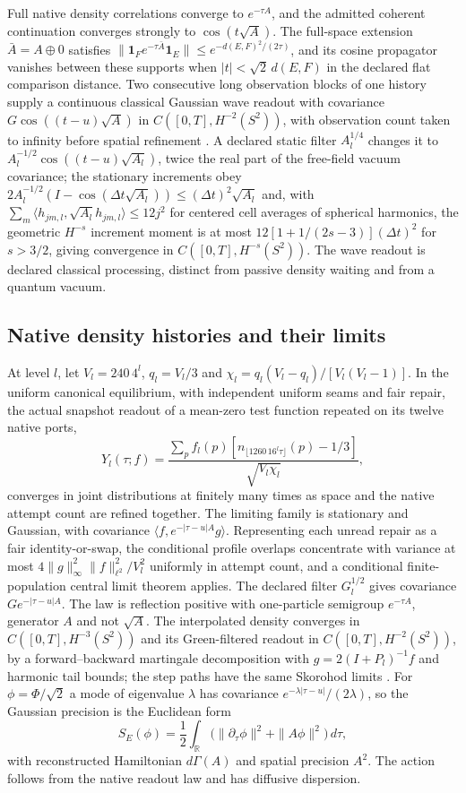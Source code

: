 \documentclass[11pt]{article}
\theoremstyle{definition}
\theoremstyle{remark}
\theoremstyle{plain}
\begin{document}
Full native density correlations converge to $e^{-\tau A}$, and the admitted
coherent continuation converges strongly to $\cos(t\sqrt A)$. The full-space
extension $\bar A=A\oplus0$ satisfies
$\|\mathbf1_F e^{-\tau\bar A}\mathbf1_E\|\le e^{-d(E,F)^2/(2\tau)}$, and its
cosine propagator vanishes between these supports when $|t|<\sqrt2\,d(E,F)$
in the declared flat comparison distance. Two consecutive long observation
blocks of one history supply a continuous classical Gaussian wave readout
with covariance $G\cos((t-u)\sqrt A)$ in $C([0,T],H^{-2}(S^2))$, with
observation count taken to infinity before spatial refinement
\cite{nativeContinuum}. A declared static filter $A_l^{1/4}$ changes it to
$A_l^{-1/2}\cos((t-u)\sqrt{A_l})$, twice the real part of the free-field
vacuum covariance; the stationary increments obey
$2A_l^{-1/2}(I-\cos(\Delta t\sqrt{A_l}))\le(\Delta t)^2\sqrt{A_l}$ and, with
$\sum_m\langle h_{jm,l},\sqrt{A_l}h_{jm,l}\rangle\le12j^2$ for centered cell
averages of spherical harmonics, the geometric $H^{-s}$ increment moment is
at most $12[1+1/(2s-3)](\Delta t)^2$ for $s>3/2$, giving convergence in
$C([0,T],H^{-s}(S^2))$. The wave readout is declared classical processing,
distinct from passive density waiting and from a quantum vacuum.

\subsection{Native density histories and their limits}
\label{sec:density}

At level $l$, let $V_l=240\,4^l$, $q_l=V_l/3$ and
$\chi_l=q_l(V_l-q_l)/[V_l(V_l-1)]$. In the uniform canonical equilibrium,
with independent uniform seams and fair repair, the actual snapshot readout
of a mean-zero test function repeated on its twelve native ports,
\[
 Y_l(\tau;f)=\frac{\sum_p f_l(p)
 [n_{\lfloor1260\,16^l\tau\rfloor}(p)-1/3]}{\sqrt{V_l\chi_l}},
\]
converges in joint distributions at finitely many times as space and the
native attempt count are refined together. The limiting family is stationary
and Gaussian, with covariance $\langle f,e^{-|\tau-u|A}g\rangle$.
Representing each unread repair as a fair
identity-or-swap, the conditional profile overlaps concentrate with variance
at most $4\|g\|_\infty^2\|f\|_{\ell^2}^2/V_l^2$ uniformly in attempt count,
and a conditional finite-population central limit theorem applies. The
declared filter $G_l^{1/2}$ gives covariance $Ge^{-|\tau-u|A}$. The law is
reflection positive with one-particle semigroup $e^{-\tau A}$, generator $A$
and not $\sqrt A$. The interpolated density converges in
$C([0,T],H^{-3}(S^2))$ and its Green-filtered readout in
$C([0,T],H^{-2}(S^2))$, by a forward--backward martingale decomposition with
$g=2(I+P_l)^{-1}f$ and harmonic tail bounds; the step paths have the same
Skorohod limits \cite{nativeContinuum}. For $\phi=\Phi/\sqrt2$ a mode of
eigenvalue $\lambda$ has covariance $e^{-\lambda|\tau-u|}/(2\lambda)$, so the
Gaussian precision is the Euclidean form
\[
 S_E(\phi)=\frac12\int_{\mathbb R}
       \bigl(\|\partial_\tau\phi\|^2+\|A\phi\|^2\bigr)\,d\tau,
\]
with reconstructed Hamiltonian $d\Gamma(A)$ and spatial precision $A^2$. The
action follows from the native readout law and has diffusive dispersion.
\end{document}
